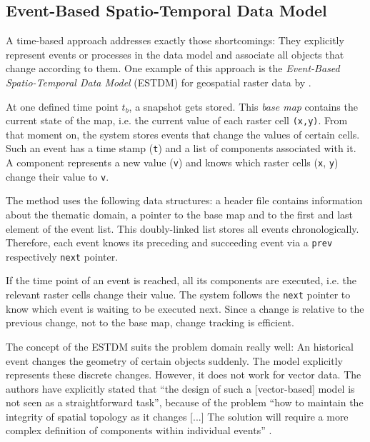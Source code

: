 
\subsection{Event-Based Spatio-Temporal Data Model} %
\label{sub:event_based_spatio_temporal_data_model}

A time-based approach addresses exactly those shortcomings: They explicitly represent events or processes in the data model and associate all objects that change according to them. One example of this approach is the \emph{Event-Based Spatio-Temporal Data Model} (ESTDM) for geospatial raster data by
\cite{peuquet95}.

At one defined time point $t_b$, a snapshot gets stored. This \emph{base map} contains the current state of the map, i.e. the current value of each raster cell \texttt{(x,y)}. From that moment on, the system stores events that change the values of certain cells. Such an event has a time stamp (\texttt{t}) and a list of components associated with it. A component represents a new value (\texttt{v}) and knows which raster cells (\texttt{x}, \texttt{y}) change their value to \texttt{v}.

The method uses the following data structures: a header file contains information about the thematic domain, a pointer to the base map and to the first and last element of the event list. This doubly-linked list stores all events chronologically. Therefore, each event knows its preceding and succeeding event via a \texttt{prev} respectively \texttt{next} pointer.

If the time point of an event is reached, all its components are executed, i.e. the relevant raster cells change their value. The system follows the \texttt{next} pointer to know which event is waiting to be executed next. Since a change is relative to the previous change, not to the base map, change tracking is efficient.

The concept of the ESTDM suits the problem domain really well: An historical event changes the geometry of certain objects suddenly. The model explicitly represents these discrete changes. However, it does not work for vector data. The authors have explicitly stated that ``the design of such a [vector-based] model is not seen as a straightforward task'', because of the problem ``how to maintain the integrity of spatial topology as it changes [...] The solution will require a more complex definition of components within individual events''
\cite[p. 21]{peuquet95}.

